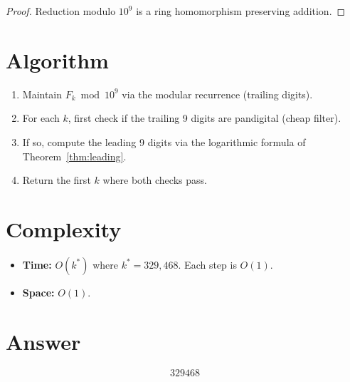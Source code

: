 \documentclass[12pt]{article}
\begin{document}
\begin{proof}
Reduction modulo $10^9$ is a ring homomorphism preserving addition.
\end{proof}

\section{Algorithm}

\begin{enumerate}
\item Maintain $F_k \bmod 10^9$ via the modular recurrence (trailing digits).
\item For each $k$, first check if the trailing 9 digits are pandigital (cheap filter).
\item If so, compute the leading 9 digits via the logarithmic formula of Theorem~\ref{thm:leading}.
\item Return the first $k$ where both checks pass.
\end{enumerate}

\section{Complexity}

\begin{itemize}
\item \textbf{Time:} $O(k^*)$ where $k^* = 329{,}468$. Each step is $O(1)$.
\item \textbf{Space:} $O(1)$.
\end{itemize}

\section{Answer}

\[
\boxed{329468}
\]
\end{document}
